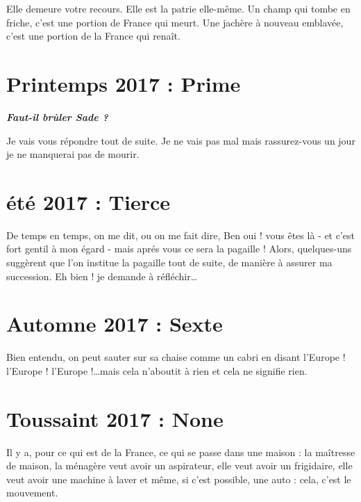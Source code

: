 \documentclass[a4paper,footinbib,final,openany,final,12pt]{book}
\begin{document}
Elle demeure votre recours. Elle est la patrie elle-m{\^{e}}me. Un champ qui tombe en friche, c'est une portion de France qui meurt. Une jach{\`{e}}re {\`{a}} nouveau emblav{\'{e}}e, c'est une portion de la France qui rena{\^{i}}t.
	
\section{Printemps 2017 : Prime}
\begin{flushright}
\emph{\textbf{\small{Faut-il br{\`{u}}ler Sade ?}}}
\end{flushright}

Je vais vous r{\'{e}}pondre tout de suite. Je ne vais pas mal mais rassurez-vous un jour je ne manquerai pas de mourir.
	
\section{{\'{e}}t{\'{e}} 2017 : Tierce}

De temps en temps, on me dit, ou on me fait dire, Ben oui ! vous {\^{e}}tes l{\`{a}} - et c'est fort gentil {\`{a}} mon {\'{e}}gard - mais apr{\'{e}}s vous ce sera la pagaille ! Alors, quelques-uns sugg{\`{e}}rent que l'on institue la pagaille tout de suite, de mani{\`{e}}re {\`{a}} assurer ma succession. Eh bien ! je demande {\`{a}} r{\'{e}}fl{\'{e}}chir\ldots
	
\section{Automne 2017 : Sexte}

Bien entendu, on peut sauter sur sa chaise comme un cabri en disant l'Europe ! l'Europe ! l'Europe !\ldots mais cela n'aboutit {\`{a}} rien et cela ne signifie rien.
	
\section{Toussaint 2017 : None}

Il y a, pour ce qui est de la France, ce qui se passe dans une maison : la ma{\^{i}}tresse de maison, la m{\'{e}}nag{\`{e}}re veut avoir un aspirateur, elle veut avoir un frigidaire, elle veut avoir une machine {\`{a}} laver et m{\^{e}}me, si c'est possible, une auto : cela, c'est le mouvement.
	
\end{document}
